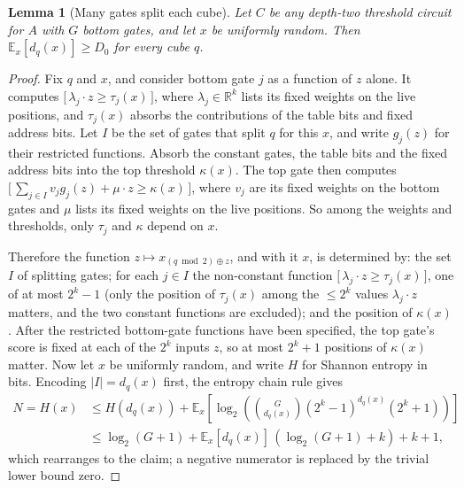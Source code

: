 \documentclass[11pt,letterpaper]{article}
\newtheorem{lemma}[theorem]{Lemma}
\theoremstyle{remark}
\newcommand{\ind}[1]{\bigl[\,#1\,\bigr]}
\begin{document}
\begin{lemma}[Many gates split each cube]\label{lem:entropy}
Let $C$ be any depth-two threshold circuit for $A$ with $G$ bottom gates, and
let $x$ be uniformly random. Then $\mathbb E_x[d_q(x)]\ge D_0$ for every cube
$q$.
\end{lemma}
\begin{proof}
Fix $q$ and $x$, and consider bottom gate $j$ as a function of $z$ alone.
It computes $\ind{\lambda_j\cdot z\ge\tau_j(x)}$, where
$\lambda_j\in\mathbb R^k$ lists its fixed weights on the live positions,
and $\tau_j(x)$ absorbs the contributions of the table bits and fixed
address bits.
Let $I$ be the set of gates that split $q$ for this $x$, and write $g_j(z)$
for their restricted functions. Absorb the constant gates, the table bits
and the fixed address bits into the top threshold $\kappa(x)$. The top gate
then computes
$\ind{\sum_{j\in I}v_jg_j(z)+\mu\cdot z\ge\kappa(x)}$, where $v_j$ are its
fixed weights on the bottom gates and $\mu$ lists its fixed weights on the
live positions. So among the weights and thresholds, only $\tau_j$ and
$\kappa$ depend on $x$.

Therefore the function $z\mapsto x_{(q\bmod2)\oplus z}$, and with it $x$, is
determined by: the set $I$ of splitting gates; for each $j\in I$ the
non-constant function $\ind{\lambda_j\cdot z\ge\tau_j(x)}$, one of at most
$2^k-1$ (only the position of $\tau_j(x)$ among the $\le2^k$ values
$\lambda_j\cdot z$ matters, and the two constant functions are excluded);
and the position of $\kappa(x)$. After the restricted bottom-gate
functions have been specified, the top gate's score is fixed at each of the
$2^k$ inputs $z$, so at most $2^k+1$ positions of $\kappa(x)$ matter.
Now let $x$ be uniformly random, and write $H$ for Shannon entropy in bits.
Encoding $|I|=d_q(x)$ first, the entropy chain rule gives
\[
\begin{aligned}
N=H(x)&\le H(d_q(x))+\mathbb E_x\!\left[\log_2\!\left(
\binom{G}{d_q(x)}(2^k-1)^{d_q(x)}(2^k+1)\right)\right]\\
&\le\log_2(G+1)+\mathbb E_x[d_q(x)]\,(\log_2(G+1)+k)+k+1,
\end{aligned}
\]
which rearranges to the claim; a negative numerator is replaced by the
trivial lower bound zero.
\end{proof}
\end{document}
